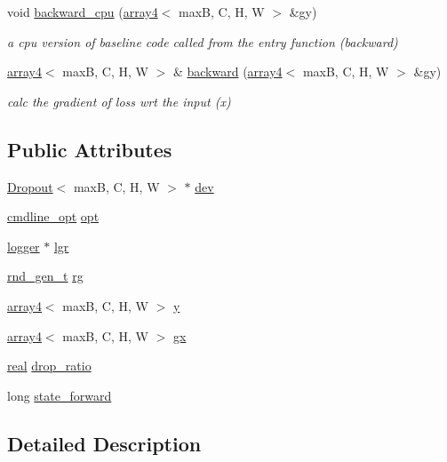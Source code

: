 \begin{DoxyCompactItemize}
void \hyperlink{structDropout_a6f78f35970607365a64e5f447bed4c04}{backward\+\_\+cpu} (\hyperlink{structarray4}{array4}$<$ maxB, C, H, W $>$ \&gy)
\begin{DoxyCompactList}\small\item\em a cpu version of baseline code called from the entry function (backward) \end{DoxyCompactList}\item 
\hyperlink{structarray4}{array4}$<$ maxB, C, H, W $>$ \& \hyperlink{structDropout_afe1afe7ce80e59d1b48c820a724aae1b}{backward} (\hyperlink{structarray4}{array4}$<$ maxB, C, H, W $>$ \&gy)
\begin{DoxyCompactList}\small\item\em calc the gradient of loss wrt the input (x) \end{DoxyCompactList}\end{DoxyCompactItemize}
\subsection*{Public Attributes}
\begin{DoxyCompactItemize}
\item 
\hyperlink{structDropout}{Dropout}$<$ maxB, C, H, W $>$ $\ast$ \hyperlink{structDropout_a2ce2e6920dfb911f679af91ff9b6de55}{dev}
\item 
\hyperlink{structcmdline__opt}{cmdline\+\_\+opt} \hyperlink{structDropout_a3d9589e177c7fd00af8d7e82db651e48}{opt}
\item 
\hyperlink{structlogger}{logger} $\ast$ \hyperlink{structDropout_a55a275be949499a6f3f27fcb9989964e}{lgr}
\item 
\hyperlink{structrnd__gen__t}{rnd\+\_\+gen\+\_\+t} \hyperlink{structDropout_a176eb537c9aef161087863244f1e637f}{rg}
\item 
\hyperlink{structarray4}{array4}$<$ maxB, C, H, W $>$ \hyperlink{structDropout_ad758df2bfbd791e6b25e29c8204e0df4}{y}
\item 
\hyperlink{structarray4}{array4}$<$ maxB, C, H, W $>$ \hyperlink{structDropout_a1cf5aced88d251c6b49772ad318bbd27}{gx}
\item 
\hyperlink{vgg__util_8h_a1082d08aaa761215ec83e7149f27ad16}{real} \hyperlink{structDropout_a4181a1bcb986c62b1c6a82a3c1e03d9f}{drop\+\_\+ratio}
\item 
long \hyperlink{structDropout_ac409c1b3a996e35eb78964aa52c5a203}{state\+\_\+forward}
\end{DoxyCompactItemize}


\subsection{Detailed Description}
